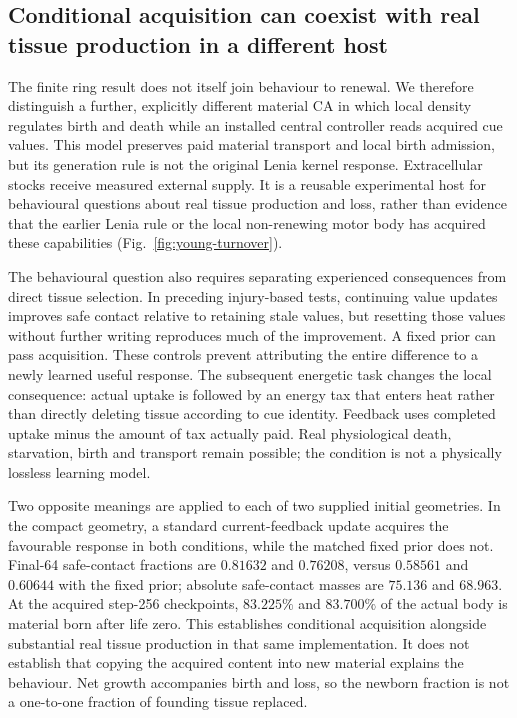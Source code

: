 \subsection*{Conditional acquisition can coexist with real tissue production in a different host}

The finite ring result does not itself join behaviour to renewal. We therefore distinguish a further, explicitly different material CA in which local density regulates birth and death while an installed central controller reads acquired cue values. This model preserves paid material transport and local birth admission, but its generation rule is not the original Lenia kernel response. Extracellular stocks receive measured external supply. It is a reusable experimental host for behavioural questions about real tissue production and loss, rather than evidence that the earlier Lenia rule or the local non-renewing motor body has acquired these capabilities (Fig.~\ref{fig:young-turnover}).

The behavioural question also requires separating experienced consequences from direct tissue selection. In preceding injury-based tests, continuing value updates improves safe contact relative to retaining stale values, but resetting those values without further writing reproduces much of the improvement. A fixed prior can pass acquisition. These controls prevent attributing the entire difference to a newly learned useful response. The subsequent energetic task changes the local consequence: actual uptake is followed by an energy tax that enters heat rather than directly deleting tissue according to cue identity. Feedback uses completed uptake minus the amount of tax actually paid. Real physiological death, starvation, birth and transport remain possible; the condition is not a physically lossless learning model.

Two opposite meanings are applied to each of two supplied initial geometries. In the compact geometry, a standard current-feedback update acquires the favourable response in both conditions, while the matched fixed prior does not. Final-64 safe-contact fractions are $0.81632$ and $0.76208$, versus $0.58561$ and $0.60644$ with the fixed prior; absolute safe-contact masses are $75.136$ and $68.963$. At the acquired step-256 checkpoints, $83.225\%$ and $83.700\%$ of the actual body is material born after life zero. This establishes conditional acquisition alongside substantial real tissue production in that same implementation. It does not establish that copying the acquired content into new material explains the behaviour. Net growth accompanies birth and loss, so the newborn fraction is not a one-to-one fraction of founding tissue replaced.

